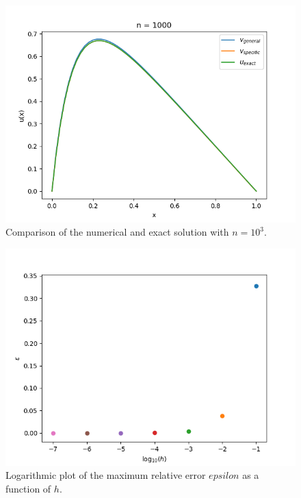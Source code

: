\documentclass[english, nofootinbib]{revtex4-1}  %
\begin{document}
\begin{figure}[h!]
        \centering 
        \includegraphics[scale=0.8]{FYS3150_oblig1_3.png} 
        \caption{Comparison of the numerical and exact solution with $n = 10^3$.}
        \label{fig:n=1000}
\end{figure}


\begin{figure}[h!]
        \centering 
        \includegraphics[scale=0.8]{error_plot.png} 
        \caption{Logarithmic plot of the maximum relative error $epsilon$ as a function of $h$.}
        \label{fig:error_plot}
\end{figure}
\end{document}

